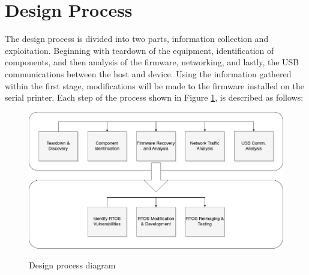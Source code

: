 

\section{Design Process}  \label{designprocess}

The design process is divided into two parts, information collection and exploitation. Beginning with teardown of the equipment, identification of components, and then analysis of the firmware, networking, and lastly, the USB communications between the host and device. Using the information gathered within the first stage, modifications will be made to the firmware installed on the serial printer. Each step of the process shown in Figure \ref{fig:designprocess_diagram}, is described as follows:

\begin{figure}[ht]
    \centering
    {\includegraphics[width=148mm,scale=0.8]
    {Figures/Methodology_unlabeled.drawio.png}}
    \caption{Design process diagram}
    \label{fig:designprocess_diagram}
\end{figure}

